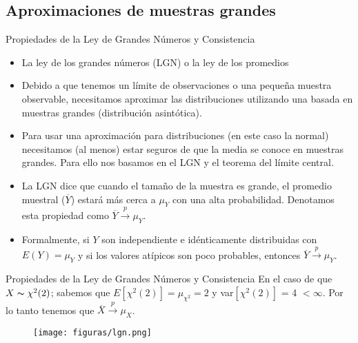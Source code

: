 \subsection{Aproximaciones de muestras grandes}
{\small
\begin{frame}{Propiedades de la Ley de Grandes Números y Consistencia}
	\begin{itemize}
		\item La ley de los grandes números (LGN) o la ley de los promedios
		\item Debido a que tenemos un límite de observaciones o una pequeña muestra observable, necesitamos aproximar las distribuciones utilizando una basada en muestras grandes (distribución asintótica).
		\item Para usar una aproximación para distribuciones (en este caso la normal) necesitamos (al menos) estar seguros de que la media se conoce en muestras grandes. Para ello nos basamos en el LGN y el teorema del límite central.
		\item La LGN dice que cuando el tamaño de la muestra es grande, el promedio muestral ($\overline{Y}$) estará más cerca a $\mu_{Y}$ con una alta probabilidad. Denotamos esta propiedad como $\overline{Y} \xrightarrow{p} \mu_{Y}$.
		\item Formalmente, si $Y$ son independiente e idénticamente distribuidas con $E(Y)=\mu_{Y}$ y si los valores atípicos son poco probables, entonces $\overline{Y} \xrightarrow{p} \mu_{Y}$.
	\end{itemize}
\end{frame}
}
\begin{frame}{Propiedades de la Ley de Grandes Números y Consistencia}
	En el caso de que $X \thicksim \chi^{2}(2)$; sabemos que $E[\chi^{2}(2)]=\mu_{\chi^{2}}=2$ y var$[\chi^{2}(2)]$ = 4 $< \infty$. Por lo tanto tenemos que $\overline{X} \xrightarrow{p} \mu_{X}$.
		\begin{figure}
			\centering
			\texttt{[image: figuras/lgn.png]}
		\end{figure}
\end{frame}
